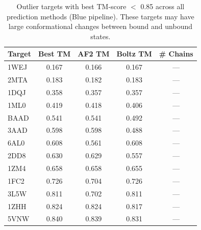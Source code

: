 \begin{table}[htbp]
\centering
\caption{Outlier targets with best TM-score $<$ 0.85 across all prediction methods (Blue pipeline). These targets may have large conformational changes between bound and unbound states.}
\label{tab:outliers-blue}
\begin{tabular}{lcccc}
\toprule
Target & Best TM & AF2 TM & Boltz TM & \# Chains \\
\midrule
  1WEJ & 0.167 & 0.166 & 0.167 & --- \\
  2MTA & 0.183 & 0.182 & 0.183 & --- \\
  1DQJ & 0.358 & 0.357 & 0.357 & --- \\
  1ML0 & 0.419 & 0.418 & 0.406 & --- \\
  BAAD & 0.541 & 0.541 & 0.492 & --- \\
  3AAD & 0.598 & 0.598 & 0.488 & --- \\
  6AL0 & 0.608 & 0.561 & 0.608 & --- \\
  2DD8 & 0.630 & 0.629 & 0.557 & --- \\
  1ZM4 & 0.658 & 0.658 & 0.655 & --- \\
  1FC2 & 0.726 & 0.704 & 0.726 & --- \\
  3L5W & 0.811 & 0.702 & 0.811 & --- \\
  1ZHH & 0.824 & 0.824 & 0.817 & --- \\
  5VNW & 0.840 & 0.839 & 0.831 & --- \\
\bottomrule
\end{tabular}
\end{table}